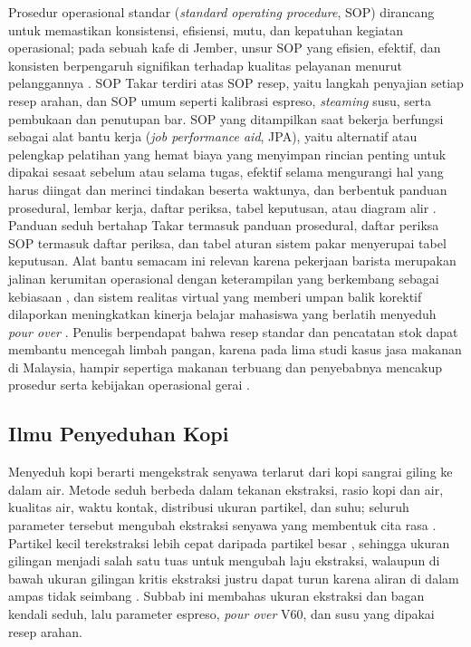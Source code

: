 Prosedur operasional standar (\textit{standard operating procedure}, SOP) dirancang untuk memastikan konsistensi, efisiensi, mutu, dan kepatuhan kegiatan operasional; pada sebuah kafe di Jember, unsur SOP yang efisien, efektif, dan konsisten berpengaruh signifikan terhadap kualitas pelayanan menurut pelanggannya \citep*{chapitoline2024pengaruh}. SOP Takar terdiri atas SOP resep, yaitu langkah penyajian setiap resep arahan, dan SOP umum seperti kalibrasi espreso, \textit{steaming} susu, serta pembukaan dan penutupan bar. SOP yang ditampilkan saat bekerja berfungsi sebagai alat bantu kerja (\textit{job performance aid}, JPA), yaitu alternatif atau pelengkap pelatihan yang hemat biaya yang menyimpan rincian penting untuk dipakai sesaat sebelum atau selama tugas, efektif selama mengurangi hal yang harus diingat dan merinci tindakan beserta waktunya, dan berbentuk panduan prosedural, lembar kerja, daftar periksa, tabel keputusan, atau diagram alir \citep*{campbell1996job}. Panduan seduh bertahap Takar termasuk panduan prosedural, daftar periksa SOP termasuk daftar periksa, dan tabel aturan sistem pakar menyerupai tabel keputusan. Alat bantu semacam ini relevan karena pekerjaan barista merupakan jalinan kerumitan operasional dengan keterampilan yang berkembang sebagai kebiasaan \citep*{lee2022barista}, dan sistem realitas virtual yang memberi umpan balik korektif dilaporkan meningkatkan kinerja belajar mahasiswa yang berlatih menyeduh \textit{pour over} \citep*{yu2021developing}. Penulis berpendapat bahwa resep standar dan pencatatan stok dapat membantu mencegah limbah pangan, karena pada lima studi kasus jasa makanan di Malaysia, hampir sepertiga makanan terbuang dan penyebabnya mencakup prosedur serta kebijakan operasional gerai \citep{papargyropoulou2019patterns}.

\subsection{Ilmu Penyeduhan Kopi}
\label{subsec:penyeduhan}

Menyeduh kopi berarti mengekstrak senyawa terlarut dari kopi sangrai giling ke dalam air. Metode seduh berbeda dalam tekanan ekstraksi, rasio kopi dan air, kualitas air, waktu kontak, distribusi ukuran partikel, dan suhu; seluruh parameter tersebut mengubah ekstraksi senyawa yang membentuk cita rasa \citep*{cordoba2020coffee}. Partikel kecil terekstraksi lebih cepat daripada partikel besar \citep{uman2016effect}, sehingga ukuran gilingan menjadi salah satu tuas untuk mengubah laju ekstraksi, walaupun di bawah ukuran gilingan kritis ekstraksi justru dapat turun karena aliran di dalam ampas tidak seimbang \citep*{lee2023uneven}. Subbab ini membahas ukuran ekstraksi dan bagan kendali seduh, lalu parameter espreso, \textit{pour over} V60, dan susu yang dipakai resep arahan.

